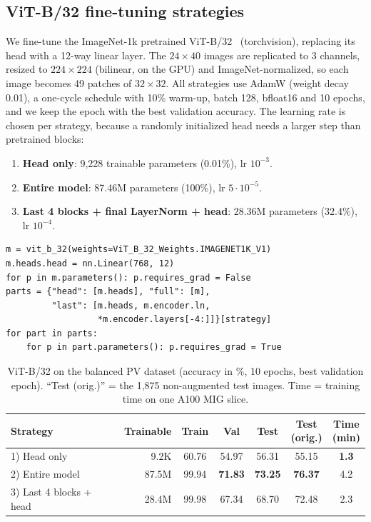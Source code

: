 \documentclass[10pt,twocolumn,letterpaper]{article}
\begin{document}
\subsection{ViT-B/32 fine-tuning strategies}
\label{sec:p2-2}
We fine-tune the ImageNet-1k pretrained ViT-B/32~\cite{dosovitskiy2021vit} (torchvision), replacing its head with a 12-way linear layer. The $24{\times}40$ images are replicated to 3 channels, resized to $224{\times}224$ (bilinear, on the GPU) and ImageNet-normalized, so each image becomes 49 patches of $32{\times}32$. All strategies use AdamW (weight decay 0.01), a one-cycle schedule with 10\% warm-up, batch 128, bfloat16 and 10 epochs, and we keep the epoch with the best validation accuracy. The learning rate is chosen per strategy, because a randomly initialized head needs a larger step than pretrained blocks:
\begin{enumerate}[nosep,leftmargin=*]
\item \textbf{Head only}: 9{,}228 trainable parameters (0.01\%), lr $10^{-3}$.
\item \textbf{Entire model}: 87.46M parameters (100\%), lr $5\cdot10^{-5}$.
\item \textbf{Last 4 blocks + final LayerNorm + head}: 28.36M parameters (32.4\%), lr $10^{-4}$.
\end{enumerate}

\begin{lstlisting}[float=tbp,caption={Selecting the trainable parameters for each strategy.},label={lst:freeze}]
m = vit_b_32(weights=ViT_B_32_Weights.IMAGENET1K_V1)
m.heads.head = nn.Linear(768, 12)
for p in m.parameters(): p.requires_grad = False
parts = {"head": [m.heads], "full": [m],
         "last": [m.heads, m.encoder.ln,
                  *m.encoder.layers[-4:]]}[strategy]
for part in parts:
    for p in part.parameters(): p.requires_grad = True
\end{lstlisting}

\begin{table}[t]
\centering\footnotesize\setlength{\tabcolsep}{3pt}
\begin{tabular}{@{}lrccccc@{}}
\toprule
Strategy & Trainable & Train & Val & Test & \makecell{Test\\(orig.)} & \makecell{Time\\(min)} \\
\midrule
1) Head only & 9.2K & 60.76 & 54.97 & 56.31 & 55.15 & \textbf{1.3} \\
2) Entire model & 87.5M & 99.94 & \textbf{71.83} & \textbf{73.25} & \textbf{76.37} & 4.2 \\
3) Last 4 blocks + head & 28.4M & 99.98 & 67.34 & 68.70 & 72.48 & 2.3 \\
\bottomrule
\end{tabular}
\caption{ViT-B/32 on the balanced PV dataset (accuracy in \%, 10 epochs, best validation epoch). ``Test (orig.)'' = the 1{,}875 non-augmented test images. Time = training time on one A100 MIG slice.}
\label{tab:vit-pv}
\end{table}
\end{document}
